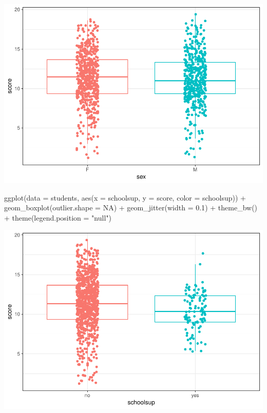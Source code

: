 \documentclass[]{article}
\newenvironment{Shaded}{\begin{snugshade}}{\end{snugshade}}
\newcommand{\DataTypeTok}[1]{\textcolor[rgb]{0.87,0.87,0.75}{#1}}
\newcommand{\FloatTok}[1]{\textcolor[rgb]{0.75,0.75,0.82}{#1}}
\newcommand{\KeywordTok}[1]{\textcolor[rgb]{0.94,0.87,0.69}{#1}}
\newcommand{\NormalTok}[1]{\textcolor[rgb]{0.80,0.80,0.80}{#1}}
\newcommand{\OperatorTok}[1]{\textcolor[rgb]{0.94,0.94,0.82}{#1}}
\newcommand{\OtherTok}[1]{\textcolor[rgb]{0.94,0.94,0.56}{#1}}
\newcommand{\StringTok}[1]{\textcolor[rgb]{0.80,0.58,0.58}{#1}}
\begin{document}
\includegraphics{Practica2_files/figure-latex/unnamed-chunk-53-1.pdf}

\begin{Shaded}
\begin{Highlighting}[]
\KeywordTok{ggplot}\NormalTok{(}\DataTypeTok{data =}\NormalTok{ students, }\KeywordTok{aes}\NormalTok{(}\DataTypeTok{x =}\NormalTok{ schoolsup, }\DataTypeTok{y =}\NormalTok{ score, }\DataTypeTok{color =}\NormalTok{ schoolsup)) }\OperatorTok{+}
\StringTok{  }\KeywordTok{geom_boxplot}\NormalTok{(}\DataTypeTok{outlier.shape =} \OtherTok{NA}\NormalTok{) }\OperatorTok{+}
\StringTok{  }\KeywordTok{geom_jitter}\NormalTok{(}\DataTypeTok{width =} \FloatTok{0.1}\NormalTok{) }\OperatorTok{+}
\StringTok{  }\KeywordTok{theme_bw}\NormalTok{() }\OperatorTok{+}
\StringTok{  }\KeywordTok{theme}\NormalTok{(}\DataTypeTok{legend.position =} \StringTok{"null"}\NormalTok{)}
\end{Highlighting}
\end{Shaded}

\includegraphics{Practica2_files/figure-latex/unnamed-chunk-53-2.pdf}
\end{document}
